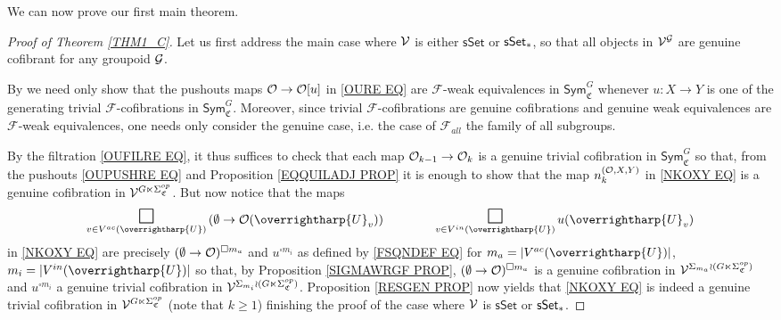 \documentclass[a4paper,10pt
,draft
]{article}%
\renewcommand{\F}{\mathcal F}
\renewcommand{\1}{\eta}%
\newcommand{\vect}[1]{\text{\overrightharp{\ensuremath{#1}}}}
\begin{document}
We can now prove our first main theorem.

\begin{proof}[Proof of Theorem \ref{THM1_C}]
Let us first address the main case where $\mathcal V$
is either $\mathsf{sSet}$ or $\mathsf{sSet}_{\**}$, 
so that all objects in $\mathcal V^{\mathcal{G}}$ are genuine cofibrant for any groupoid $\mathcal{G}$.

By \cite[Thm. 11.3.2]{Hir03} we need only show that
the pushouts maps $\mathcal{O} \to \mathcal{O}[u]$ in \eqref{OURE EQ}
are $\F$-weak equivalences in $\mathsf{Sym}^G_{\mathfrak{C}}$
whenever 
$u \colon X \to Y$
is one of the generating trivial $\F$-cofibrations in 
$\mathsf{Sym}^G_{\mathfrak{C}}$.
Moreover, since trivial $\F$-cofibrations are genuine cofibrations and 
genuine weak equivalences are $\F$-weak equivalences, one needs only consider the genuine case, i.e. the case of $\F_{all}$ the family of all subgroups.

By the filtration \eqref{OUFILRE EQ}, it thus suffices to check that each map $\mathcal{O}_{k-1} \to \mathcal{O}_k$
is a genuine trivial cofibration in $\mathsf{Sym}^G_{\mathfrak{C}}$
so that, from the pushouts \eqref{OUPUSHRE EQ}
and Proposition \ref{EQQUILADJ PROP}
it is enough to show that the map
$n_k^{(\mathcal{O},X,Y)}$ in \eqref{NKOXY EQ}
is a genuine cofibration in $\mathcal V^{G \ltimes \Sigma_{\mathfrak{C}}^{op}}$.
But now notice that the maps
\[
\mathop{\mathlarger{\mathlarger{\mathlarger{\square}}}}\limits_{v \in V^{ac}(\vect{U})} \left( \emptyset \to \O(\vect{U}_v)\right) 
\qquad \qquad
\mathop{\mathlarger{\mathlarger{\mathlarger{\square}}}}\limits_{v \in V^{in}(\vect{U})} u(\vect{U}_v)
\]
in \eqref{NKOXY EQ} are precisely 
$(\emptyset \to \mathcal{O})^{\square m_a}$ and 
$u^{\square m_i}$ 
as defined by \eqref{FSQNDEF EQ} for
$m_a = |V^{ac}(\vect U)|$,
$m_i = |V^{in}(\vect U)|$
so that, by Proposition \ref{SIGMAWRGF PROP},
$(\emptyset \to \mathcal{O})^{\square m_a}$ is a 
genuine cofibration in
$\mathcal V^{\Sigma_{m_a} \wr (G \ltimes \Sigma_{\mathfrak{C}}^{op})}$ and
$u^{\square m_i}$ a
genuine trivial cofibration in 
$\mathcal V^{\Sigma_{m_i} \wr (G \ltimes \Sigma_{\mathfrak{C}}^{op})}$.
Proposition \ref{RESGEN PROP}
now yields that \eqref{NKOXY EQ} is indeed a genuine trivial cofibration in $\mathcal V^{G \ltimes \Sigma_{\mathfrak{C}}^{op}}$
(note that $k \geq 1$) finishing the proof of the 
case where $\mathcal V$ is $\mathsf{sSet}$ or $\mathsf{sSet}_{\**}$.




\end{proof}
\end{document}
